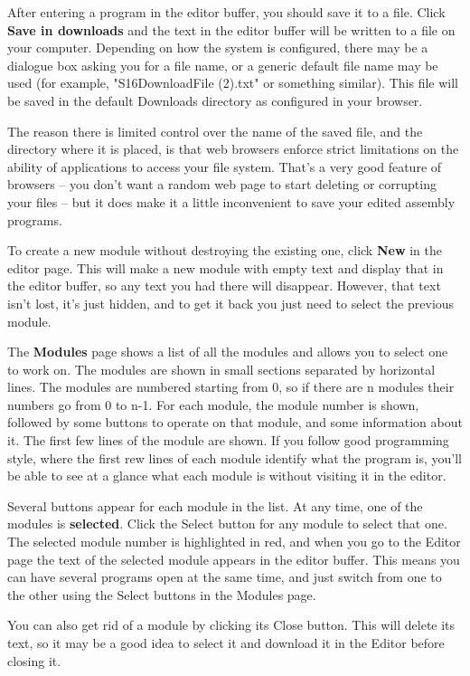 \documentclass[11pt]{article}
\begin{document}
\begin{itemize}
After entering a program in the editor buffer, you should save it to a
file.  Click \textbf{Save in downloads} and the text in the editor buffer
will be written to a file on your computer.  Depending on how the
system is configured, there may be a dialogue box asking you for a
file name, or a generic default file name may be used (for example,
"S16DownloadFile (2).txt" or something similar).  This file will be
saved in the default Downloads directory as configured in your
browser.

The reason there is limited control over the name of the saved file,
and the directory where it is placed, is that web browsers enforce
strict limitations on the ability of applications to access your file
system.  That's a very good feature of browsers -- you don't want a
random web page to start deleting or corrupting your files -- but it
does make it a little inconvenient to save your edited assembly
programs.

To create a new module without destroying the existing one, click
\textbf{New} in the editor page.  This will make a new module with empty text
and display that in the editor buffer, so any text you had there will
disappear.  However, that text isn't lost, it's just hidden, and to
get it back you just need to select the previous module.

The \textbf{Modules} page shows a list of all the modules and allows you to
select one to work on.  The modules are shown in small sections
separated by horizontal lines.  The modules are numbered starting from
0, so if there are n modules their numbers go from 0 to n-1.  For each
module, the module number is shown, followed by some buttons to
operate on that module, and some information about it.  The first few
lines of the module are shown.  If you follow good programming style,
where the first rew lines of each module identify what the program is,
you'll be able to see at a glance what each module is without visiting
it in the editor.

Several buttons appear for each module in the list.  At any time, one
of the modules is \textbf{selected}. Click the Select button for any module
to select that one.  The selected module number is highlighted in red,
and when you go to the Editor page the text of the selected module
appears in the editor buffer.  This means you can have several
programs open at the same time, and just switch from one to the other
using the Select buttons in the Modules page.

You can also get rid of a module by clicking its Close button.  This
will delete its text, so it may be a good idea to select it and
download it in the Editor before closing it.


\end{itemize}
\end{document}
